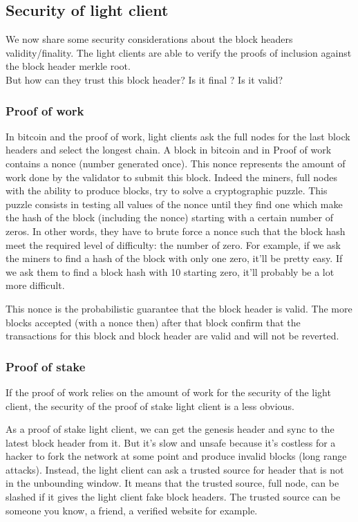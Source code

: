 \subsection{Security of light client}
\label{background:security}
We now share some security considerations about the block headers validity/finality. The light clients are able to verify the proofs of inclusion against the block header merkle root. \\But how can they trust this block header? Is it final ? Is it valid? 

\subsubsection{Proof of work}
In bitcoin and the proof of work, light clients ask the full nodes for the last block headers and select the longest chain. 
A block in bitcoin and in Proof of work contains a nonce (number generated once). This nonce represents the amount of work done by the validator to submit this block. 
Indeed the miners, full nodes with the ability to produce blocks, try to solve a cryptographic puzzle. This puzzle consists in testing all values of the nonce until they find one which make the hash of the block (including the nonce) starting with a certain number of zeros. 
In other words, they have to brute force a nonce such that the block hash meet the required level of difficulty: the number of zero. 
For example, if we ask the miners to find a hash of the block with only one zero, it'll be pretty easy. If we ask them to find a block hash with 10 starting zero, it'll probably be a lot more difficult. 

This nonce is the probabilistic guarantee that the block header is valid. The more blocks accepted (with a nonce then) after that block confirm that the transactions for this block and block header are valid and will not be reverted.

\subsubsection{Proof of stake}
If the proof of work relies on the amount of work for the security of the light client, the security of the proof of stake light client is a less obvious. 

As a proof of stake light client, we can get the genesis header and sync to the latest block header from it. But it's slow and unsafe because it's costless for a hacker to fork the network at some point and produce invalid blocks (long range attacks). 
Instead, the light client can ask a trusted source for header that is not in the unbounding window. It means that the trusted source, full node, can be slashed if it gives the light client fake block headers. The trusted source can be someone you know, a friend, a verified website for example.